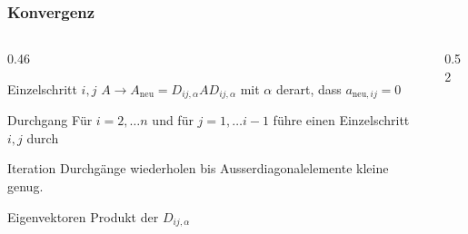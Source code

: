 %
%
%
\begin{frame}[fragile]
\def\gitter{
\foreach \x in {1,...,6}{
	\draw (0.5,-\x)--(6.5,-\x);
	\draw (\x,-0.5)--(\x,-6.5);
}
}
\frametitle{Konvergenz}
\vspace{-15pt}
\begin{columns}[t]
\begin{column}{0.46\hsize}
\begin{block}{Einzelschritt $i,j$}
$A\to A_{\text{neu}} = D_{ij,\alpha}AD_{ij,\alpha}$ mit
$\alpha$ derart, dass
$a_{\text{neu},ij}=0$
\end{block}
\begin{block}{Durchgang}
Für $i=2,\dots n$ und für $j=1,\dots i-1$
führe einen Einzelschritt $i,j$ durch
\end{block}
\begin{block}{Iteration}
Durchgänge wiederholen bis Ausserdiagonalelemente kleine
genug.
\end{block}
\begin{block}{Eigenvektoren}
Produkt der $D_{ij,\alpha}$
\end{block}
\end{column}
\begin{column}{0.52\hsize}
\begin{center}
\end{center}
\end{column}
\end{columns}
\end{frame}
